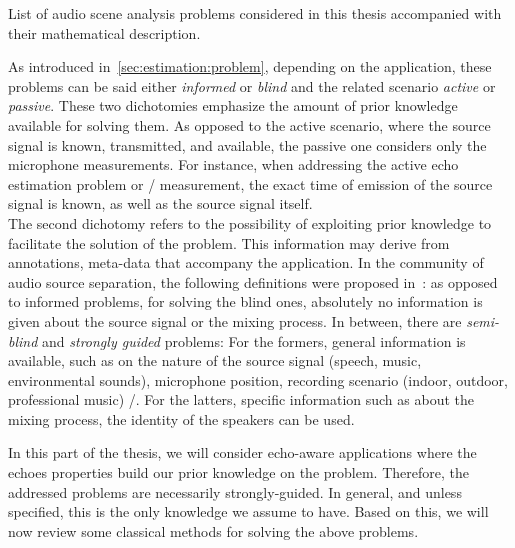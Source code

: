 \begin{table}[!h]

    \begin{fullwidth}
    \centering
    \small
    \renewcommand{\arraystretch}{1.3}

    
    \caption{List of audio scene analysis problems considered in this thesis accompanied with their mathematical description.}
    \label{tab:processing:problems}

    \end{fullwidth}

\end{table}

\mynewline
As introduced in~\cref{sec:estimation:problem}, depending on the application, these problems can be said either \textit{informed} or \textit{blind} and the related scenario \textit{active} or \textit{passive}.
These two dichotomies emphasize the amount of prior knowledge available for solving them.
As opposed to the active scenario, where the source signal is known, transmitted, and available, the passive one considers only the microphone measurements.
For instance, when addressing the active echo estimation problem or \RIR/ measurement, the exact time of emission of the source signal is known, as well as the source signal itself.
\\The second dichotomy refers to the possibility of exploiting prior knowledge to facilitate the solution of the problem.
This information may derive from annotations, meta-data that accompany the application.
In the community of audio source separation, the following definitions were proposed in~:
as opposed to informed problems, for solving the blind ones, absolutely no information is given about the source signal or the mixing process.
In between, there are \textit{semi-blind} and \textit{strongly guided} problems:
For the formers, general information is available, such as on the nature of the source signal (speech, music, environmental sounds),
microphone position, recording scenario (indoor, outdoor, professional music) \etc/.
For the latters, specific information such as about the mixing process, the identity of the speakers can be used.

\mynewline
In this part of the thesis, we will consider echo-aware applications where the echoes properties build our prior knowledge on the problem.
Therefore, the addressed problems are necessarily strongly-guided.
In general, and unless specified, this is the only knowledge we assume to have.
Based on this, we will now review some classical methods for solving the above problems.


